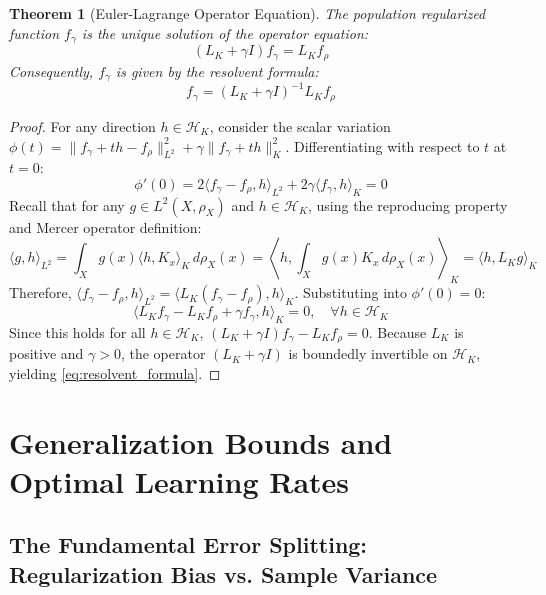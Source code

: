 \documentclass[11pt,a4paper]{article}
\newtheorem{theorem}{Theorem}[section]
\theoremstyle{definition}
\begin{document}
\begin{theorem}[Euler-Lagrange Operator Equation]\label{thm:euler_lagrange}
The population regularized function $f_\gamma$ is the unique solution of the operator equation:
\begin{equation}\label{eq:normal_operator_eq}
(L_K + \gamma I) f_\gamma = L_K f_\rho
\end{equation}
Consequently, $f_\gamma$ is given by the resolvent formula:
\begin{equation}\label{eq:resolvent_formula}
f_\gamma = (L_K + \gamma I)^{-1} L_K f_\rho
\end{equation}
\end{theorem}

\begin{proof}
For any direction $h \in \mathcal{H}_K$, consider the scalar variation $\phi(t) = \|f_\gamma + t h - f_\rho\|_{L^2}^2 + \gamma \|f_\gamma + t h\|_K^2$.
Differentiating with respect to $t$ at $t = 0$:
\[
\phi'(0) = 2 \langle f_\gamma - f_\rho, h \rangle_{L^2} + 2 \gamma \langle f_\gamma, h \rangle_K = 0
\]
Recall that for any $g \in L^2(X, \rho_X)$ and $h \in \mathcal{H}_K$, using the reproducing property and Mercer operator definition:
\[
\langle g, h \rangle_{L^2} = \int_X g(x) \langle h, K_x \rangle_K \, d\rho_X(x) = \left\langle h, \int_X g(x) K_x \, d\rho_X(x) \right\rangle_K = \langle h, L_K g \rangle_K
\]
Therefore, $\langle f_\gamma - f_\rho, h \rangle_{L^2} = \langle L_K(f_\gamma - f_\rho), h \rangle_K$. Substituting into $\phi'(0) = 0$:
\[
\langle L_K f_\gamma - L_K f_\rho + \gamma f_\gamma, h \rangle_K = 0, \quad \forall h \in \mathcal{H}_K
\]
Since this holds for all $h \in \mathcal{H}_K$, $(L_K + \gamma I) f_\gamma - L_K f_\rho = 0$. Because $L_K$ is positive and $\gamma > 0$, the operator $(L_K + \gamma I)$ is boundedly invertible on $\mathcal{H}_K$, yielding \eqref{eq:resolvent_formula}.
\end{proof}

\section{Generalization Bounds and Optimal Learning Rates}\label{sec:generalization}

\subsection{The Fundamental Error Splitting: Regularization Bias vs. Sample Variance}
\end{document}

